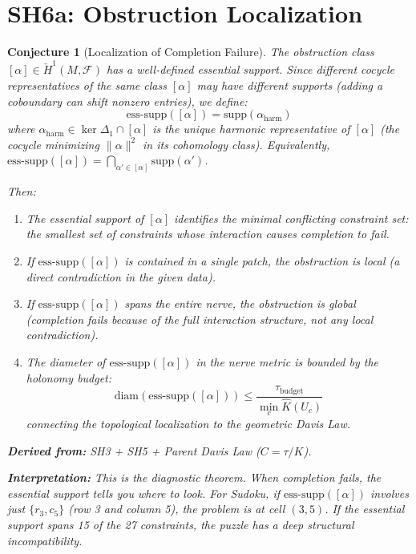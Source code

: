 \documentclass[11pt,letterpaper]{article}
\newtheorem{conjecture}{Conjecture}[section]
\newcommand{\Khat}{\hat{K}}
\newcommand{\tbudget}{\tau_{\mathrm{budget}}}
\newcommand{\Hcech}{\check{H}}
\newcommand{\sheaf}{\mathcal{F}}
\begin{document}
\section{SH6a: Obstruction Localization}

\begin{conjecture}[Localization of Completion 
Failure]\label{conj:localization}
The obstruction class $[\alpha] \in \Hcech^1(M, \sheaf)$ has a 
well-defined \emph{essential support}. Since different cocycle 
representatives of the same class $[\alpha]$ may have different 
supports (adding a coboundary can shift nonzero entries), we define:
\begin{equation}\label{eq:support}
    \mathrm{ess\text{-}supp}([\alpha]) = \mathrm{supp}
    (\alpha_{\mathrm{harm}})
\end{equation}
where $\alpha_{\mathrm{harm}} \in \ker \Delta_1 \cap [\alpha]$ is the 
unique \emph{harmonic representative} of $[\alpha]$ (the cocycle 
minimizing $\|\alpha\|^2$ in its cohomology class). Equivalently, 
$\mathrm{ess\text{-}supp}([\alpha]) = \bigcap_{\alpha' \in [\alpha]} 
\mathrm{supp}(\alpha')$.

Then:
\begin{enumerate}[label=(\alph*)]
    \item The essential support of $[\alpha]$ identifies the 
    \emph{minimal conflicting constraint set}: the smallest set of 
    constraints whose interaction causes completion to fail.
    
    \item If $\mathrm{ess\text{-}supp}([\alpha])$ is contained in a 
    single patch, the obstruction is \emph{local} (a direct 
    contradiction in the given data).
    
    \item If $\mathrm{ess\text{-}supp}([\alpha])$ spans the entire 
    nerve, the obstruction is \emph{global} (completion fails because 
    of the full interaction structure, not any local contradiction).
    
    \item The \emph{diameter} of $\mathrm{ess\text{-}supp}([\alpha])$ 
    in the nerve metric is bounded by the holonomy budget:
    \begin{equation}\label{eq:support_diameter}
        \mathrm{diam}(\mathrm{ess\text{-}supp}([\alpha])) \leq 
        \frac{\tbudget}{\min_c \Khat(U_c)}
    \end{equation}
    connecting the topological localization to the geometric Davis Law.
\end{enumerate}

\textbf{Derived from:} SH3 + SH5 + Parent Davis Law ($C = \tau / K$).

\textbf{Interpretation:} This is the diagnostic theorem. When 
completion fails, the essential support tells you \emph{where} to 
look. For Sudoku, if $\mathrm{ess\text{-}supp}([\alpha])$ involves 
just $\{r_3, c_5\}$ (row 3 and column 5), the problem is at cell 
$(3,5)$. If the essential support spans 15 of the 27 constraints, the 
puzzle has a deep structural incompatibility.
\end{conjecture}
\end{document}
